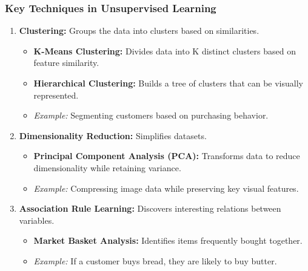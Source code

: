 \documentclass[aspectratio=169]{beamer}
\begin{document}
\begin{frame}[fragile]
    \frametitle{Key Techniques in Unsupervised Learning}
    \begin{enumerate}
        \item \textbf{Clustering:} Groups the data into clusters based on similarities.
            \begin{itemize}
                \item \textbf{K-Means Clustering:} Divides data into K distinct clusters based on feature similarity.
                \item \textbf{Hierarchical Clustering:} Builds a tree of clusters that can be visually represented.
                \item \textit{Example:} Segmenting customers based on purchasing behavior.
            \end{itemize}
        
        \item \textbf{Dimensionality Reduction:} Simplifies datasets.
            \begin{itemize}
                \item \textbf{Principal Component Analysis (PCA):} Transforms data to reduce dimensionality while retaining variance.
                \item \textit{Example:} Compressing image data while preserving key visual features.
            \end{itemize}
        
        \item \textbf{Association Rule Learning:} Discovers interesting relations between variables.
            \begin{itemize}
                \item \textbf{Market Basket Analysis:} Identifies items frequently bought together.
                \item \textit{Example:} If a customer buys bread, they are likely to buy butter.
            \end{itemize}
    \end{enumerate}
\end{frame}
\end{document}
